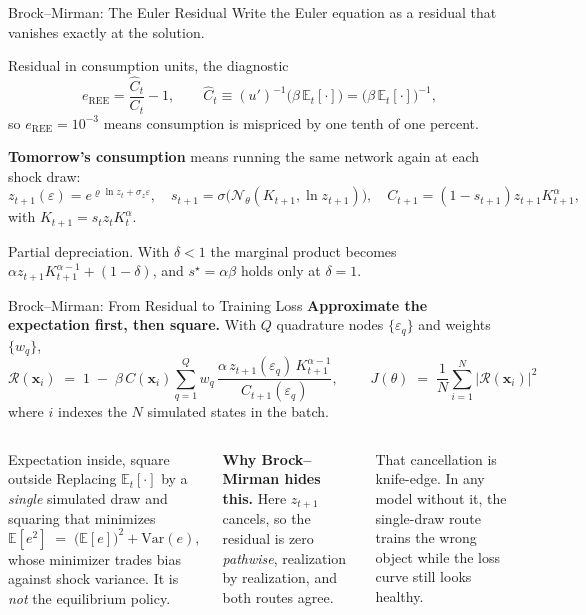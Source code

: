 \documentclass[aspectratio=169,11pt]{beamer}
\newcommand{\emphc}[1]{\textcolor{harvardcrimson}{#1}}
\newcommand{\x}{\bm{x}}
\newcommand{\E}[1]{\mathbb{E}\!\left[#1\right]}
\newcommand{\Et}[1]{\mathbb{E}_t\!\left[#1\right]}
\newcommand{\param}{\theta}          %
\newcommand{\state}{\bm{x}}          %
\newcommand{\resid}{\mathcal{R}}     %
\newcommand{\net}{\mathcal{N}_{\param}} %
\begin{document}
\begin{frame}{Brock--Mirman: The Euler Residual}
Write the Euler equation as a residual that vanishes exactly at the solution.
\begin{block}{Residual in consumption units, the diagnostic}
\[
e_{\mathrm{REE}} = \frac{\widehat{C}_t}{C_t} - 1, \qquad
\widehat{C}_t \equiv (u')^{-1}\bigl(\beta\,\Et{\cdot}\bigr) = \bigl(\beta\,\Et{\cdot}\bigr)^{-1},
\]
so $e_{\mathrm{REE}} = 10^{-3}$ means consumption is mispriced by \emphc{one tenth of one percent}.
\end{block}

\textbf{Tomorrow's consumption} means running the \emphc{same network again} at each shock draw:
\[
z_{t+1}(\varepsilon) = e^{\varrho \ln z_t + \sigma_z \varepsilon}, \quad
s_{t+1} = \sigma\bigl(\net(K_{t+1}, \ln z_{t+1})\bigr), \quad
C_{t+1} = (1-s_{t+1}) z_{t+1} K_{t+1}^{\alpha} ,
\]
with $K_{t+1} = s_t z_t K_t^\alpha$.

{\footnotesize \emphc{Partial depreciation.} With $\delta<1$ the marginal product becomes $\alpha z_{t+1} K_{t+1}^{\alpha-1} + (1-\delta)$, and $s^\star = \alpha\beta$ holds only at $\delta=1$.}
\end{frame}

\begin{frame}{Brock--Mirman: From Residual to Training Loss}
\textbf{Approximate the expectation first, then square.} With $Q$ quadrature nodes $\{\varepsilon_q\}$ and weights $\{w_q\}$,
\[
\resid(\state_i) \;=\; 1 \;-\; \beta\, C(\state_i) \sum_{q=1}^{Q} w_q\,
\frac{\alpha\, z_{t+1}(\varepsilon_q)\, K_{t+1}^{\alpha-1}}{C_{t+1}(\varepsilon_q)},
\qquad
\boxed{\;J(\param) \;=\; \frac{1}{N}\sum_{i=1}^{N} \bigl|\resid(\state_i)\bigr|^2\;}
\]
where $i$ indexes the $N$ simulated states in the batch.

\begin{columns}[T]
\begin{alertblock}{Expectation inside, square outside}
\footnotesize
Replacing $\Et{\cdot}$ by a \emph{single} simulated draw and squaring that minimizes
\[
\E{e^2} \;=\; \bigl(\E{e}\bigr)^2 + \mathrm{Var}(e),
\]
whose minimizer trades bias against shock variance. It is \emph{not} the equilibrium policy.
\end{alertblock}

\textbf{Why Brock--Mirman hides this.} Here $z_{t+1}$ cancels, so the residual is zero \emph{pathwise}, realization by realization, and both routes agree.

\vspace{0.3em}
That cancellation is knife-edge. In any model without it, the single-draw route trains the wrong object while the loss curve still looks healthy.
\end{columns}
\end{frame}
\end{document}
